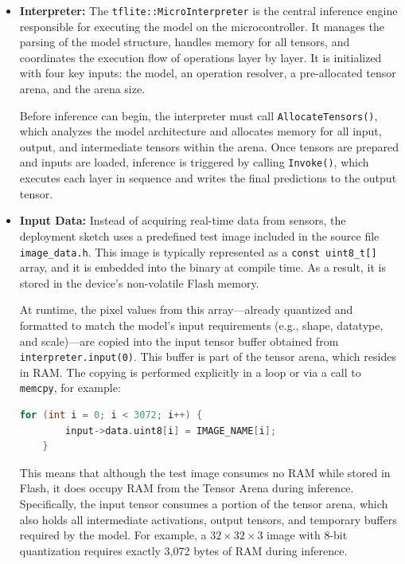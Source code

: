\begin{itemize}
    \item \textbf{Interpreter:} 
    The \texttt{tflite::MicroInterpreter} is the central inference engine responsible for executing the model on the microcontroller. It manages the parsing of the model structure, handles memory for all tensors, and coordinates the execution flow of operations layer by layer. It is initialized with four key inputs: the model, an operation resolver, a pre-allocated tensor arena, and the arena size.
    
    Before inference can begin, the interpreter must call \texttt{AllocateTensors()}, which analyzes the model architecture and allocates memory for all input, output, and intermediate tensors within the arena. Once tensors are prepared and inputs are loaded, inference is triggered by calling \texttt{Invoke()}, which executes each layer in sequence and writes the final predictions to the output tensor.
    

    \item \textbf{Input Data:} 
    Instead of acquiring real-time data from sensors, the deployment sketch uses a predefined test image included in the source file \texttt{image\_data.h}. This image is typically represented as a \texttt{const uint8\_t[]} array, and it is embedded into the binary at compile time. As a result, it is stored in the device’s non-volatile Flash memory.
    
    At runtime, the pixel values from this array—already quantized and formatted to match the model’s input requirements (e.g., shape, datatype, and scale)—are copied into the input tensor buffer obtained from \texttt{interpreter.input(0)}. This buffer is part of the tensor arena, which resides in RAM. The copying is performed explicitly in a loop or via a call to \texttt{memcpy}, for example:
    
    \begin{lstlisting}[language=C, caption={Copying input image data ( test image ) from Flash to RAM input tensor}, label=lst:copy_input_tensor]
    for (int i = 0; i < 3072; i++) {
        input->data.uint8[i] = IMAGE_NAME[i];
    }
    \end{lstlisting}

    
    This means that although the test image consumes no RAM while stored in Flash, it does occupy RAM from the Tensor Arena during inference. Specifically, the input tensor consumes a portion of the tensor arena, which also holds all intermediate activations, output tensors, and temporary buffers required by the model. For example, a \(32 \times 32 \times 3\) image with 8-bit quantization requires exactly 3,072 bytes of RAM during inference.
    

\end{itemize}
